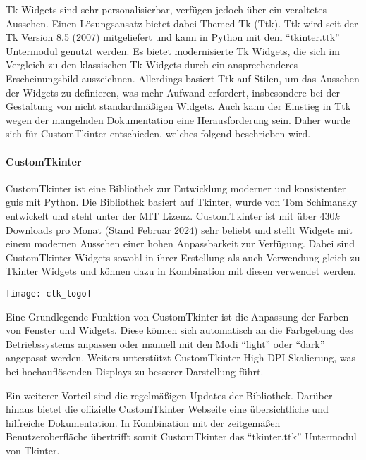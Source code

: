 Tk Widgets sind sehr personalisierbar, verfügen jedoch über ein veraltetes Aussehen. Einen Lösungsansatz bietet dabei Themed Tk (Ttk). Ttk wird seit der Tk Version 8.5 (2007) mitgeliefert und kann in Python mit dem \enquote{tkinter.ttk} Untermodul genutzt werden. Es bietet modernisierte Tk Widgets, die sich im Vergleich zu den klassischen Tk Widgets durch ein ansprechenderes Erscheinungsbild auszeichnen. Allerdings basiert Ttk  auf Stilen, um das Aussehen der Widgets zu definieren, was mehr Aufwand erfordert, insbesondere bei der Gestaltung von nicht standardmäßigen Widgets. Auch kann der Einstieg in Ttk wegen der mangelnden Dokumentation eine Herausforderung sein. Daher wurde sich für CustomTkinter entschieden, welches folgend beschrieben wird. \cite[vgl.][]{Python_Software_Foundation_Tk:o.J., stackoverflow_tk_ttk:2013}


\paragraph{CustomTkinter}
\begin{minipage}{0.6\textwidth}
	CustomTkinter ist eine Bibliothek zur Entwicklung moderner und konsistenter \acsp{gui} mit Python. Die Bibliothek basiert auf Tkinter, wurde von Tom Schimansky entwickelt und steht unter der MIT Lizenz. CustomTkinter ist mit über $430k$ Downloads pro Monat (Stand Februar 2024) sehr beliebt und stellt Widgets mit einem modernen Aussehen einer hohen Anpassbarkeit zur Verfügung. Dabei sind CustomTkinter Widgets sowohl in ihrer Erstellung als auch Verwendung gleich zu Tkinter Widgets und können dazu in Kombination mit diesen verwendet werden. \cite[vgl.][]{Schimansky_Git:o.J.}
\end{minipage}%
\hfill
\begin{minipage}{0.37\textwidth}
	\centering	
	\texttt{[image: ctk\_logo]}
\end{minipage}
\vspace{1ex}

Eine Grundlegende Funktion von CustomTkinter ist die Anpassung der Farben von Fenster und Widgets. Diese können sich automatisch an die Farbgebung des Betriebssystems anpassen oder manuell mit den Modi \enquote{light} oder \enquote{dark} angepasst werden. Weiters unterstützt CustomTkinter High DPI Skalierung, was bei hochauflösenden Displays zu besserer Darstellung führt. \cite[vgl.][]{Schimansky_Git:o.J.}

Ein weiterer Vorteil sind die regelmäßigen Updates der Bibliothek. Darüber hinaus bietet die offizielle CustomTkinter Webseite eine übersichtliche und hilfreiche Dokumentation. In Kombination mit der zeitgemäßen Benutzeroberfläche übertrifft somit CustomTkinter das \enquote{tkinter.ttk} Untermodul von Tkinter.



